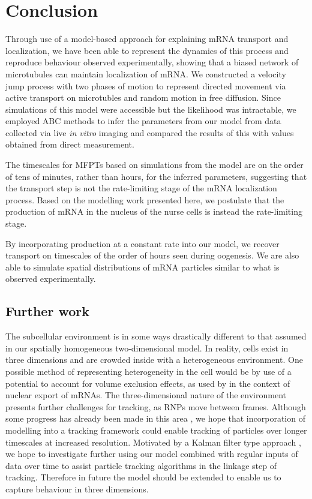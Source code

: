 \documentclass[twocolumn]{biophys}
\begin{document}
\section{Conclusion} \label{Conclusions}
Through use of a model-based approach for explaining mRNA transport and localization, we have been able to represent the dynamics of this process and reproduce behaviour observed experimentally, showing that a biased network of microtubules can maintain localization of mRNA.
We constructed a velocity jump process with two phases of motion to represent directed movement via active transport on microtubles and random motion in free diffusion.
Since simulations of this model were accessible but the likelihood was intractable, we employed ABC methods to infer the parameters from our model from data collected via live \textit{in vitro} imaging and compared the results of this with values obtained from direct measurement.

The timescales for MFPTs based on simulations from the model are on the order of tens of minutes, rather than hours, for the inferred parameters, suggesting that the transport step is not the rate-limiting stage of the mRNA localization process.
Based on the modelling work presented here, we postulate that the production of mRNA in the nucleus of the nurse cells is instead the rate-limiting stage.

By incorporating production at a constant rate into our model, we recover transport on timescales of the order of hours seen during oogenesis.
We are also able to simulate spatial distributions of mRNA particles similar to what is observed experimentally.  

\subsection{Further work}
The subcellular environment is in some ways drastically different to that assumed in our spatially homogeneous two-dimensional model.
In reality, cells exist in three dimensions and are crowded inside with a heterogeneous environment. 
One possible method of representing heterogeneity in the cell would be by use of a potential to account for volume exclusion effects, as used by \citet{isaacson2011influence} in the context of nuclear export of mRNAs.
The three-dimensional nature of the environment presents further challenges for tracking, as RNPs move between frames.
Although some progress has already been made in this area \citep{thompson2010three}, we hope that incorporation of modelling into a tracking framework could enable tracking of particles over longer timescales at increased resolution. 
Motivated by a Kalman filter type approach \citep{faragher2012understanding}, we hope to investigate further using our model combined with regular inputs of data over time to assist particle tracking algorithms in the linkage step of tracking.
Therefore in future the model should be extended to enable us to capture behaviour in three dimensions. 
\end{document}
